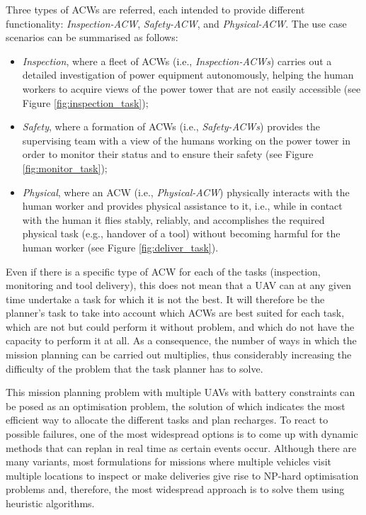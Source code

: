 Three types of \glspl{ACW} are referred, each intended to provide different functionality: \textit{Inspection-ACW}, \textit{Safety-ACW}, and \textit{Physical-ACW}. The use case scenarios can be summarised as follows: 

\begin{itemize}
    \item \textit{Inspection}, where a fleet of \glspl{ACW} (i.e., \textit{Inspection-ACWs}) carries out a detailed investigation of power equipment autonomously, helping the human workers to acquire views of the power tower that are not easily accessible (see Figure \ref{fig:inspection_task});
    \item \textit{Safety}, where a formation of \glspl{ACW} (i.e., \textit{Safety-ACWs}) provides the supervising team with a view of the humans working on the power tower in order to monitor their status and to ensure their safety (see Figure \ref{fig:monitor_task});
    \item \textit{Physical}, where an \gls{ACW} (i.e., \textit{Physical-ACW}) physically interacts with the human worker and provides physical assistance to it, i.e., while in contact with the human it flies stably, reliably, and accomplishes the required physical task (e.g., handover of a tool) without becoming harmful for the human worker (see Figure \ref{fig:deliver_task}).
\end{itemize} 

Even if there is a specific type of \gls{ACW} for each of the tasks (inspection, monitoring and tool delivery), this does not mean that a \gls{UAV} can at any given time undertake a task for which it is not the best. It will therefore be the planner's task to take into account which \glspl{ACW} are best suited for each task, which are not but could perform it without problem, and which do not have the capacity to perform it at all. As a consequence, the number of ways in which the mission planning can be carried out multiplies, thus considerably increasing the difficulty of the problem that the task planner has to solve.

This mission planning problem with multiple \glspl{UAV} with battery constraints can be posed as an optimisation problem, the solution of which indicates the most efficient way to allocate the different tasks and plan recharges. To react to possible failures, one of the most widespread options is to come up with dynamic methods that can replan in real time as certain events occur. Although there are many variants, most formulations for missions where multiple vehicles visit multiple locations to inspect or make deliveries give rise to NP-hard optimisation problems and, therefore, the most widespread approach is to solve them using heuristic algorithms.

